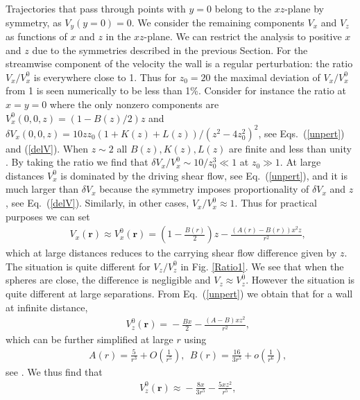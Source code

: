 Trajectories that pass through points with $y=0$ belong to  the $xz$-plane by symmetry, as $V_y(y=0)=0$. We consider the remaining components $V_x$ and $V_z$ as functions of $x$ and $z$ in the $xz$-plane. We can restrict the analysis to positive $x$ and $z$ due to the symmetries described in the previous Section. For the streamwise component of the velocity the wall is a regular perturbation: the ratio $V_x/V_x^0$ is everywhere close to 1.  Thus for $z_0=20$ the maximal deviation of $V_x/V_x^0$ from 1 is seen numerically to be less than 1\%. Consider for instance the ratio at $x=y=0$ where the only nonzero components are $V_x^0(0, 0, z)=(1-B(z)/2)z$ and $\delta V_x(0, 0, z) = 10 z z_0(1+K(z)+L(z))/(z^2-4z_0^2)^2$, see
Eqs.~(\ref{unpert}) and (\ref{delV}). When $z \sim 2$ all $B(z),K(z),L(z)$ are finite and less than unity \cite{batchelor_green_1972}. By taking the ratio we find that $\delta V_x/V_x^0 \sim  10/z_0^3\ll 1$ at $z_0\gg 1$.
At large distances $V_x^0$ is dominated by the driving shear flow, see Eq.~(\ref{unpert}), and it is much larger than $\delta V_x$ because the symmetry imposes proportionality of $\delta V_x$ and $z$, see Eq.~(\ref{delV}).
Similarly, in other cases, $V_x/V_x^0\approx 1$. Thus for practical purposes we can set
\begin{eqnarray}&&\!\!\!\!\!\!\!\!\!\!\!\!\!\!\!\!
V_x(\bm r)\approx V^0_x(\bm r)\!=\!\left(1\!-\!\frac{B(r)}{2}\right) z\!-\!\frac{(A(r)-B(r))x^2z}{r^2}, \label{practical}
\end{eqnarray}
which at large distances reduces to the carrying shear flow difference given by $z$.
The situation is quite different for $V_z/V_z^0$ in Fig. \ref{Ratio1}.
We see that when the spheres are close, the difference is negligible and $V_z\approx V_z^0$. However the situation is quite different at
large separations. From Eq.~(\ref{unpert}) we obtain that for a wall at infinite distance,
\begin{eqnarray}&&\!\!\!\!\!\!\!\!\!\!\!\!\!\!\!\!
V^0_z(\bm r)\!=\!-\frac{ B x }{2}\!-\!\frac{(A-B)xz^2}{r^2},\label{sdh}
\end{eqnarray}
which can be further simplified at large $r$ using
\begin{eqnarray}&&\!\!\!\!\!\!\!\!\!\!\!\!\!\!\!\!
A(r)=\frac{5}{r^3}+O\left(\frac{1}{r^5}\right),\ \ B(r)=\frac{16}{3r^5}+o\left(\frac{1}{r^6}\right), \label{largr}
\end{eqnarray}
see \cite{batchelor_green_1972}. We thus find that
\begin{eqnarray}&&\!\!\!\!\!\!\!\!\!\!\!\!\!\!\!\!
V^0_z(\bm r)\!\approx \!-\frac{8x }{3r^5}\!-\!\frac{5 xz^2}{r^5},
\label{bgz}
\end{eqnarray}

